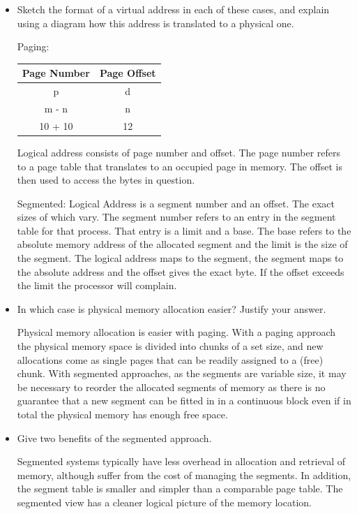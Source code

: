 \documentclass[]{article}
\begin{document}
        \begin{itemize}
            \item Sketch the format of a virtual address in each of these cases, and explain using a diagram how this address is translated to a physical one.

            Paging:
            \begin{table}[ht]
                \centering
                \begin{tabular}{cc}\hline\hline
                Page Number & Page Offset \\\hline
                p & d \\
                m - n & n \\
                10 + 10 & 12 \\\hline\hline
                \end{tabular}
            \end{table}

            Logical address consists of page number and offset. The page number refers to a page table that translates to an occupied page in memory. The offset is then used to access the bytes in question.

            Segmented:
            Logical Address is a segment number and an offset. The exact sizes of which vary. The segment number refers to an entry in the segment table for that process. That entry is a limit and a base. The base refers to the absolute memory address of the allocated segment and the limit is the size of the segment. The logical address maps to the segment, the segment maps to the absolute address and the offset gives the exact byte. If the offset exceeds the limit the processor will complain.

            \item In which case is physical memory allocation easier? Justify your answer.

            Physical memory allocation is easier with paging. With a paging approach the physical memory space is divided into chunks of a set size, and new allocations come as single pages that can be readily assigned to a (free) chunk. With segmented approaches, as the segments are variable size, it may be necessary to reorder the allocated segments of memory as there is no guarantee that a new segment can be fitted in in a continuous block even if in total the physical memory has enough free space.

            \item Give two benefits of the segmented approach.

            Segmented systems typically have less overhead in allocation and retrieval of memory, although suffer from the cost of managing the segments. In addition, the segment table is smaller and simpler than a comparable page table. The segmented view has a cleaner logical picture of the memory location.
        \end{itemize}
\end{document}
